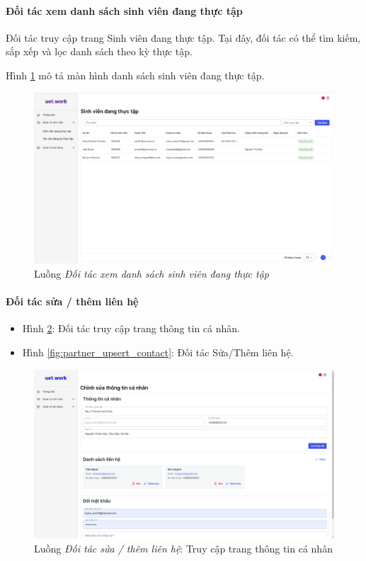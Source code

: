 \documentclass[./../main.tex]{subfiles}
\begin{document}
\paragraph*{Đối tác xem danh sách sinh viên đang thực tập}

Đối tác truy cập trang Sinh viên đang thực tập. Tại đây, đối tác có thể tìm kiếm, sắp xếp và lọc danh sách theo kỳ thực tập.

Hình \ref{fig:partner_view_list_working_students_page} mô tả màn hình danh sách sinh viên đang thực tập.

\begin{figure}[]
	\includegraphics[width=\linewidth]{./images/image9.png}
	\caption{Luồng \emph{Đối tác xem danh sách sinh viên đang thực tập}}
	\label{fig:partner_view_list_working_students_page}
\end{figure}

\paragraph*{Đối tác sửa / thêm liên hệ}

\begin{itemize}
	\item Hình \ref{fig:partner_info_page}: Đối tác truy cập trang thông tin cá nhân. 
	\item Hình \ref{fig:partner_upsert_contact}: Đối tác Sửa/Thêm liên hệ.
\end{itemize}

\begin{figure}[]
	\includegraphics[width=\linewidth]{./images/image48-1.png}
	\caption{Luồng \emph{Đối tác sửa / thêm liên hệ}: Truy cập trang thông tin cá nhân}
	\label{fig:partner_info_page}
\end{figure}
\end{document}

